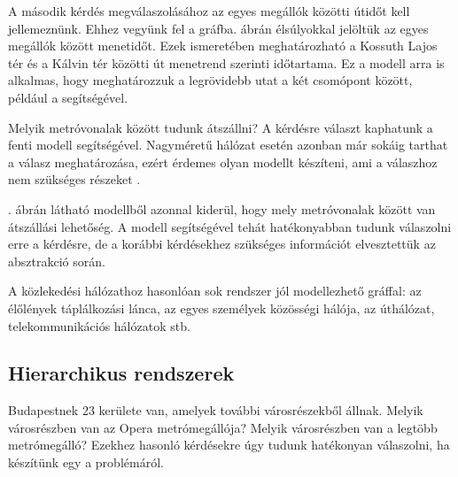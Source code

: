 A második kérdés megválaszolásához az egyes megállók közötti útidőt kell jellemeznünk. Ehhez vegyünk fel  a gráfba.  ábrán élsúlyokkal jelöltük az egyes megállók között menetidőt. Ezek ismeretében meghatározható a Kossuth Lajos tér és a Kálvin tér közötti út menetrend szerinti időtartama. Ez a modell arra is alkalmas, hogy meghatározzuk a legrövidebb utat a két csomópont között, például a  segítségével.

\begin{pelda}
	Melyik metróvonalak között tudunk átszállni? A kérdésre választ kaphatunk a fenti modell segítségével. Nagyméretű hálózat esetén azonban már sokáig tarthat a válasz meghatározása, ezért érdemes olyan modellt készíteni, ami a válaszhoz nem szükséges részeket .
\end{pelda}


. ábrán látható modellből azonnal kiderül, hogy mely metróvonalak között van átszállási lehetőség. A modell segítségével tehát hatékonyabban tudunk válaszolni erre a kérdésre, de a korábbi kérdésekhez szükséges információt elvesztettük az absztrakció során.

A közlekedési hálózathoz hasonlóan sok rendszer jól modellezhető gráffal: az élőlények táplálkozási lánca, az egyes személyek közösségi hálója, az úthálózat,  telekommunikációs hálózatok stb.
	
\subsection{Hierarchikus rendszerek}
\label{sec:hierarhcikus-rendszerek}

\begin{pelda}
	Budapestnek 23 kerülete van, amelyek további városrészekből állnak. %
	Melyik városrészben van az Opera metrómegállója? Melyik városrészben van a legtöbb metrómegálló? Ezekhez hasonló kérdésekre úgy tudunk hatékonyan válaszolni, ha készítünk egy  a problémáról.
\end{pelda}

